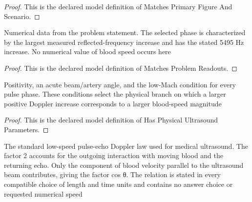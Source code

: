 \begin{proof}
  This is the declared model definition of Matches Primary Figure And Scenario.
\end{proof}
\begin{definition}
  \label{def:physics:phyx-mini-0324:phyxminiproblems-problemphyxmini0324-matchesproblemreadouts}
  Numerical data from the problem statement. The selected phase is characterized by the largest measured reflected-frequency increase and has the stated 5495 Hz increase. No numerical value of blood speed occurs here
\end{definition}
\begin{proof}
  This is the declared model definition of Matches Problem Readouts.
\end{proof}
\begin{definition}
  \label{def:physics:phyx-mini-0324:phyxminiproblems-problemphyxmini0324-hasphysicalultrasoundparameters}
  Positivity, an acute beam/artery angle, and the low-Mach condition for every pulse phase. These conditions select the physical branch on which a larger positive Doppler increase corresponds to a larger blood-speed magnitude
\end{definition}
\begin{proof}
  This is the declared model definition of Has Physical Ultrasound Parameters.
\end{proof}
\begin{definition}
  \label{def:physics:phyx-mini-0324:phyxminiproblems-problemphyxmini0324-satisfiespulseechodopplerlaw}
  The standard low-speed pulse-echo Doppler law used for medical ultrasound. The factor 2 accounts for the outgoing interaction with moving blood and the returning echo. Only the component of blood velocity parallel to the ultrasound beam contributes, giving the factor cos θ. The relation is stated in every compatible choice of length and time units and contains no answer choice or requested numerical speed
\end{definition}
